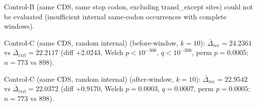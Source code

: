 Control-B (same CDS, same stop codon, excluding transl\_except sites) could not be evaluated (insufficient internal same-codon occurrences with complete windows).

Control-C (same CDS, random internal) (before-window, $k=10$): $\bar{\Delta}_\mathrm{rec}=24.2361$ vs $\bar{\Delta}_\mathrm{ctrl}=22.2117$ (diff +2.0243, Welch $p<10^{-300}$, $q<10^{-300}$, perm $p=0.0005$; $n=773$ vs 898).

Control-C (same CDS, random internal) (after-window, $k=10$): $\bar{\Delta}_\mathrm{rec}=22.9542$ vs $\bar{\Delta}_\mathrm{ctrl}=22.0372$ (diff +0.9170, Welch $p=0.0003$, $q=0.0007$, perm $p=0.0005$; $n=773$ vs 898).
